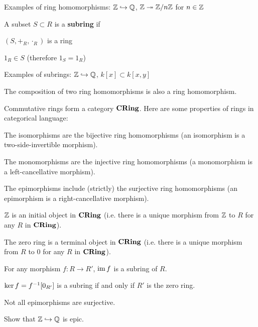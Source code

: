 \begin{exam}
	Examples of ring homomorphisms: $\mathbb{Z} \hookrightarrow \mathbb{Q}$, $\mathbb{Z} \twoheadrightarrow \mathbb{Z}/n\mathbb{Z}$ for $n \in \mathbb{Z}$
\end{exam}

\begin{defn}
	A subset $S \subset R$ is a \textbf{subring} if
	\begin{enum}
		\item $(S,+_R,\cdot_R)$ is a ring
		\item $1_R \in S$ (therefore $1_S=1_R$)
	\end{enum}
\end{defn}

\begin{exam}
	Examples of subrings: $\mathbb{Z} \hookrightarrow \mathbb{Q}$, $k[x] \subset k[x,y]$
\end{exam}

\begin{rmk}	
	The composition of two ring homomorphisms is also a ring homomorphism.
\end{rmk}

\begin{prop}
	Commutative rings form a category $\mathbf{CRing}$.
	Here are some properties of rings in categorical language:
	\begin{enum}
		\item The isomorphisms are the bijective ring homomorphisms (an isomorphism is a two-side-invertible morphism).
		\item The monomorphisms are the injective ring homomorphisms (a monomorphism is a left-cancellative morphism).
		\item The epimorphisms include (strictly) the surjective ring homomorphisms (an epimorphism is a right-cancellative morphism).
		\item $\mathbb{Z}$ is an initial object in $\mathbf{CRing}$ (i.e. there is a unique morphism from $\mathbb{Z}$ to $R$ for any $R$ in $\mathbf{CRing}$).
		\item The zero ring is a terminal object in $\mathbf{CRing}$ (i.e. there is a unique morphism from $R$ to $0$ for any $R$ in $\mathbf{CRing}$).
		\item For any morphism $f: R \to R'$, $\operatorname{im} f$ is a subring of $R$.
		\item $\ker f = f^{-1}[0_{R'}]$ is a subring if and only if $R'$ is the zero ring.
	\end{enum}
\end{prop}

Not all epimorphisms are surjective.
\begin{exer}
	Show that $\mathbb{Z} \hookrightarrow \mathbb{Q}$ is epic.
\end{exer}

